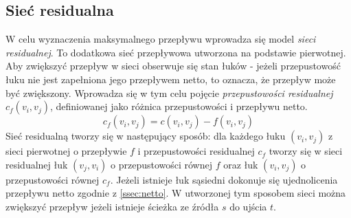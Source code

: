 \subsection{Sieć residualna}\label{ssec:siecResidualna}
W celu wyznaczenia maksymalnego przepływu wprowadza się model \textit{sieci residualnej}. To dodatkowa sieć przepływowa utworzona na podstawie pierwotnej. Aby zwiększyć przepływ w sieci obserwuje się stan łuków - jeżeli przepustowość łuku nie jest zapełniona jego przepływem netto, to oznacza, że przepływ może być zwiększony. Wprowadza się w tym celu pojęcie \textit{przepustowości residualnej} $ c_f(v_i,v_j) $, definiowanej jako różnica przepustowości i przepływu netto.
$$ c_f(v_i,v_j)=c(v_i,v_j)-f(v_i,v_j) $$
Sieć residualną tworzy się w następujący sposób: dla każdego łuku $ (v_i,v_j) $ z sieci pierwotnej o przepływie $ f $ i przepustowości residualnej $ c_f $ tworzy się w sieci residualnej łuk $ (v_j,v_i) $ o przepustowości równej $ f $ oraz łuk $ (v_i,v_j) $ o przepustowości równej $ c_f $. Jeżeli istnieje łuk sąsiedni dokonuje się ujednolicenia przepływu netto zgodnie z \ref{ssec:netto}. W utworzonej tym sposobem sieci można zwiększyć przepływ jeżeli istnieje ścieżka ze źródła $ s $ do ujścia $ t $.
